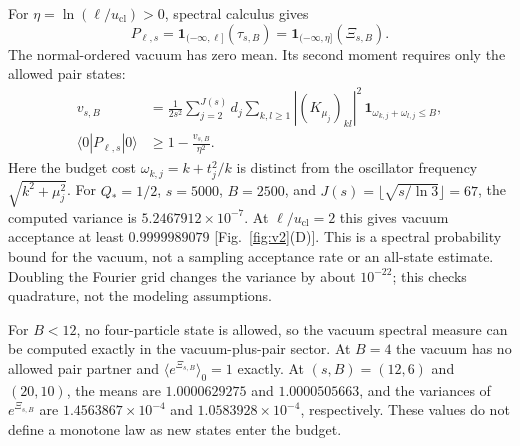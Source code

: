 For $\eta=\ln(\ell/u_{\mathrm{cl}})>0$, spectral calculus gives
\begin{equation}\label{eq:clock_proj_equiv}
P_{\ell,s}=\mathbf1_{(-\infty,\ell]}(\tau_{s,B})
=\mathbf1_{(-\infty,\eta]}(\Xi_{s,B}).
\end{equation}
The normal-ordered vacuum has zero mean. Its second moment requires only the allowed pair states:
\begin{align}\label{eq:projected_clock_variance}
v_{s,B}&=\frac1{2s^2}\sum_{j=2}^{J(s)}d_j\sum_{k,l\ge1}
|(K_{\mu_j})_{kl}|^2\,
\mathbf1_{\omega_{k,j}+\omega_{l,j}\le B},\nonumber\\
\langle0|P_{\ell,s}|0\rangle&\ge1-\frac{v_{s,B}}{\eta^2}.
\end{align}
Here the budget cost $\omega_{k,j}=k+t_j^2/k$ is distinct from the oscillator frequency $\sqrt{k^2+\mu_j^2}$. For $Q_*=1/2$, $s=5000$, $B=2500$, and $J(s)=\lfloor\sqrt{s/\ln3}\rfloor=67$, the computed variance is $5.2467912\times10^{-7}$. At $\ell/u_{\mathrm{cl}}=2$ this gives vacuum acceptance at least $0.9999989079$ [Fig.~\ref{fig:v2}(D)]. This is a spectral probability bound for the vacuum, not a sampling acceptance rate or an all-state estimate. Doubling the Fourier grid changes the variance by about $10^{-22}$; this checks quadrature, not the modeling assumptions.

For $B<12$, no four-particle state is allowed, so the vacuum spectral measure can be computed exactly in the vacuum-plus-pair sector. At $B=4$ the vacuum has no allowed pair partner and $\langle e^{\Xi_{s,B}}\rangle_0=1$ exactly. At $(s,B)=(12,6)$ and $(20,10)$, the means are $1.0000629275$ and $1.0000505663$, and the variances of $e^{\Xi_{s,B}}$ are $1.4563867\times10^{-4}$ and $1.0583928\times10^{-4}$, respectively. These values do not define a monotone law as new states enter the budget.

